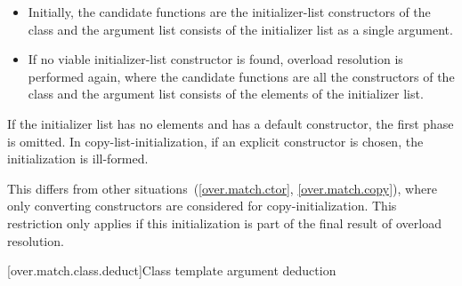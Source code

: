 \begin{itemize}
\item
Initially, the candidate functions are the initializer-list constructors
of the class  and
the argument list consists of the initializer list as a single argument.

\item
If no viable initializer-list constructor is found, overload resolution is
performed again, where the candidate functions are all the constructors of
the class  and
the argument list consists of the elements of the initializer list.
\end{itemize}

If the initializer list has no elements and  has a default constructor,
the first phase is omitted.
In copy-list-initialization, if an explicit constructor is
chosen, the initialization is ill-formed. \begin{note}
This differs from other situations~(\ref{over.match.ctor}, \ref{over.match.copy}),
where only converting constructors are considered for copy-initialization.
This restriction only
applies if this initialization is part of the final result of overload
resolution. \end{note}

[over.match.class.deduct]{Class template argument deduction}%
%

